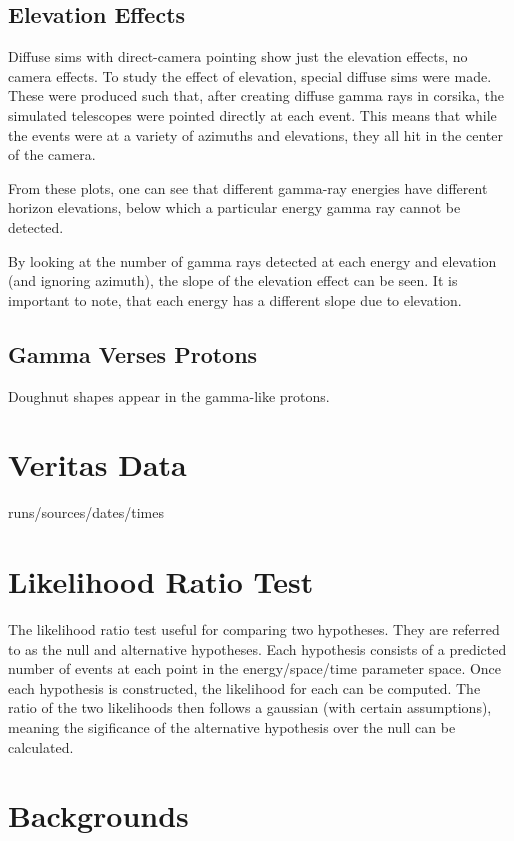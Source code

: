 \subsection{Elevation Effects}

Diffuse sims with direct-camera pointing show just the elevation effects, no camera effects.
To study the effect of elevation, special diffuse sims were made.
These were produced such that, after creating diffuse gamma rays in corsika, the simulated telescopes were pointed directly at each event.
This means that while the events were at a variety of azimuths and elevations, they all hit in the center of the camera.

From these plots, one can see that different gamma-ray energies have different horizon elevations, below which a particular energy gamma ray cannot be detected.

By looking at the number of gamma rays detected at each energy and elevation (and ignoring azimuth), the slope of the elevation effect can be seen.
It is important to note, that each energy has a different slope due to elevation.


\subsection{Gamma Verses Protons}

Doughnut shapes appear in the gamma-like protons.


\section{Veritas Data}
runs/sources/dates/times

\section{Likelihood Ratio Test}
The likelihood ratio test useful for comparing two hypotheses.
They are referred to as the null and alternative hypotheses.
Each hypothesis consists of a predicted number of events at each point in the energy/space/time parameter space.
Once each hypothesis is constructed, the likelihood for each can be computed.
The ratio of the two likelihoods then follows a gaussian (with certain assumptions), meaning the sigificance of the alternative hypothesis over the null can be calculated.

\section{Backgrounds}

